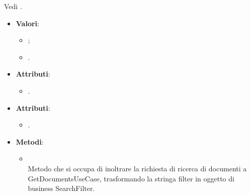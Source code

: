 \documentclass[10pt, a4paper]{article}
\begin{document}
Vedi .

\label{DocumentTypeDettaglio}
\begin{itemize}
    \item \textbf{Valori}:
    \begin{itemize}
        \item {};
        \item {}.
    \end{itemize}
\end{itemize}

\label{ElaborationExceptionDettaglio}
\begin{itemize}
    \item \textbf{Attributi}:
    \begin{itemize}
        \item {}.
    \end{itemize}
\end{itemize}


\label{GetDocumentsControllerDettaglio}
\begin{itemize}
    \item \textbf{Attributi}:
    \begin{itemize}
        \item {}.
    \end{itemize}
    \item \textbf{Metodi}:
    \begin{itemize}
        \item {}\\
        Metodo che si occupa di inoltrare la richiesta di ricerca di documenti a GetDocumentsUseCase, trasformando la stringa filter in oggetto di business SearchFilter.
    \end{itemize}
\end{itemize}
\end{document}
